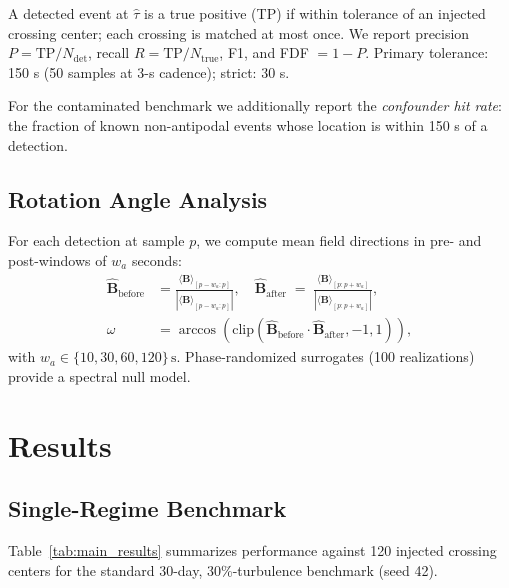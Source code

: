 \documentclass[12pt,letterpaper]{article}
\newcommand{\Bvec}{\mathbf{B}}
\newcommand{\Bhat}{\hat{\mathbf{B}}}
\newcommand{\secunit}{\,\mathrm{s}}
\begin{document}
A detected event at $\hat{\tau}$ is a true positive (TP) if within tolerance
of an injected crossing center; each crossing is matched at most once.
We report precision $P = \mathrm{TP}/N_\mathrm{det}$, recall
$R = \mathrm{TP}/N_\mathrm{true}$, F1, and FDF $= 1 - P$.
Primary tolerance: 150 s (50 samples at 3-s cadence); strict: 30 s.

For the contaminated benchmark we additionally report the \emph{confounder hit
rate}: the fraction of known non-antipodal events whose location is within
150 s of a detection.

\subsection{Rotation Angle Analysis}
\label{subsec:rotation_method}

For each detection at sample $p$, we compute mean field directions in pre-
and post-windows of $w_a$ seconds:
\begin{align}
  \Bhat_\mathrm{before} &=
    \frac{\langle\Bvec\rangle_{[p-w_a:p]}}{|\langle\Bvec\rangle_{[p-w_a:p]}|},
  \quad
  \Bhat_\mathrm{after} \;=\;
    \frac{\langle\Bvec\rangle_{[p:p+w_a]}}{|\langle\Bvec\rangle_{[p:p+w_a]}|},
  \label{eq:Bhat} \\
  \omega &= \arccos\!\left(\mathrm{clip}(\Bhat_\mathrm{before}
    \cdot \Bhat_\mathrm{after}, -1, 1)\right),
  \label{eq:omega}
\end{align}
with $w_a \in \{10, 30, 60, 120\}\secunit$.
Phase-randomized surrogates (100 realizations) provide a spectral null model.

\section{Results}
\label{sec:results}

\subsection{Single-Regime Benchmark}
\label{subsec:detection}

Table~\ref{tab:main_results} summarizes performance against 120 injected
crossing centers for the standard 30-day, 30\%-turbulence benchmark (seed 42).
\end{document}
